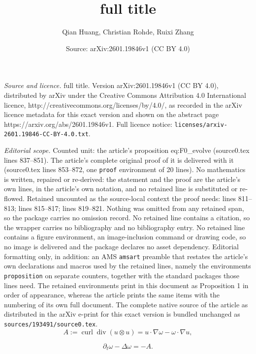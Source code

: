 \documentclass[10pt,a4paper]{amsart}
\title{full title}
\author{Qian Huang, Christian Rohde, Ruixi Zhang}
\date{Source: arXiv:2601.19846v1 (CC BY 4.0)}
\DeclareMathOperator{\curl}{curl}
\DeclareMathOperator{\dive}{div}
\begin{document}
\maketitle

\noindent\emph{Source and licence.} full title. Version arXiv:2601.19846v1 (CC BY 4.0), distributed by arXiv under the Creative Commons Attribution 4.0 International licence, http://creativecommons.org/licenses/by/4.0/, as recorded in the arXiv licence metadata for this exact version and shown on the abstract page https://arxiv.org/abs/2601.19846v1. Full licence notice: \texttt{licenses/arxiv-2601.19846-CC-BY-4.0.txt}.\par\smallskip

\noindent\textit{Editorial scope.} Counted unit: the article's proposition eq:F0\_evolve (source0.tex lines 837--851). The article's complete original proof of it is delivered with it (source0.tex lines 853--872, one \texttt{proof} environment of 20 lines). No mathematics is written, repaired or re-derived: the statement and the proof are the article's own lines, in the article's own notation, and no retained line is substituted or re-flowed.  Retained uncounted as the source-local context the proof needs: lines 811--813; lines 815--817; lines 819--821.  Nothing was omitted from any retained span, so the package carries no omission record.  No retained line contains a citation, so the wrapper carries no bibliography and no bibliography entry.  No retained line contains a figure environment, an image-inclusion command or drawing code, so no image is delivered and the package declares no asset dependency.  Editorial formatting only, in addition: an AMS \texttt{amsart} preamble that restates the article's own declarations and macros used by the retained lines, namely the environments \texttt{proposition} on separate counters, together with the standard packages those lines need.  The retained environments print in this document as Proposition 1 in order of appearance, whereas the article prints the same items with the numbering of its own full document.  The complete native source of the article as distributed in the arXiv e-print for this exact version is bundled unchanged as \texttt{sources/193491/source0.tex}.
\begin{equation} \label{eq:A0_def}
    A:=\curl\dive(u\otimes u) = u\cdot \nabla \omega - \omega \cdot \nabla u,
\end{equation}

\begin{equation} \label{eq:omega_ns}
    \partial_t\omega - \Delta \omega = -A.
\end{equation}
\end{document}
